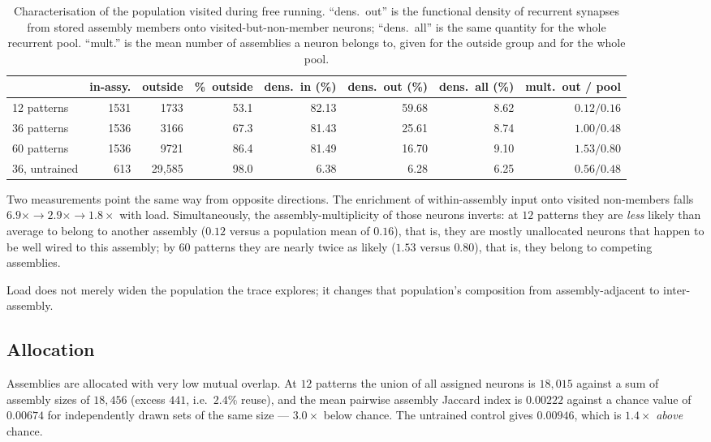 \documentclass[10pt,twocolumn,a4paper]{article}
\newcommand{\pct}{\%}
\begin{document}
\begin{table}[!t]
\centering
\caption{Characterisation of the population visited during free running. ``dens.\ out'' is
the functional density of recurrent synapses from stored assembly members onto
visited-but-non-member neurons; ``dens.\ all'' is the same quantity for the whole
recurrent pool. ``mult.'' is the mean number of assemblies a neuron belongs to, given for
the outside group and for the whole pool.}
\label{tab:union}
\footnotesize
\setlength{\tabcolsep}{4.5pt}
\begin{tabular}{lrrrrrrr}
\toprule
 & in-assy. & outside & \pct\ outside & dens.\ in (\pct) & dens.\ out (\pct) & dens.\ all (\pct) & mult.\ out / pool \\
\midrule
12 patterns & 1531 & 1733 & 53.1 & 82.13 & 59.68 & 8.62 & $0.12 / 0.16$ \\
36 patterns & 1536 & 3166 & 67.3 & 81.43 & 25.61 & 8.74 & $1.00 / 0.48$ \\
60 patterns & 1536 & 9721 & 86.4 & 81.49 & 16.70 & 9.10 & $1.53 / 0.80$ \\
\midrule
36, untrained & 613 & 29{,}585 & 98.0 & 6.38 & 6.28 & 6.25 & $0.56 / 0.48$ \\
\bottomrule
\end{tabular}
\end{table}

Two measurements point the same way from opposite directions. The enrichment of
within-assembly input onto visited non-members falls
$6.9\times \to 2.9\times \to 1.8\times$ with load. Simultaneously, the
assembly-multiplicity of those neurons inverts: at $12$ patterns they are \emph{less}
likely than average to belong to another assembly ($0.12$ versus a population mean of
$0.16$), that is, they are mostly unallocated neurons that happen to be well wired to this
assembly; by $60$ patterns they are nearly twice as likely ($1.53$ versus $0.80$), that
is, they belong to competing assemblies.

Load does not merely widen the population the trace explores; it changes that
population's composition from assembly-adjacent to inter-assembly.

\subsection{Allocation}
\label{sec:allocation}

Assemblies are allocated with very low mutual overlap. At $12$ patterns the union of all
assigned neurons is $18{,}015$ against a sum of assembly sizes of $18{,}456$ (excess
$441$, i.e.\ $2.4\pct$ reuse), and the mean pairwise assembly Jaccard index is $0.00222$
against a chance value of $0.00674$ for independently drawn sets of the same size ---
$3.0\times$ below chance. The untrained control gives $0.00946$, which is $1.4\times$
\emph{above} chance.
\end{document}
